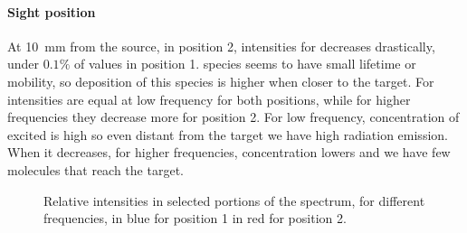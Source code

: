 \paragraph{Sight position} At \SI{10}{\milli\meter} from the source, in position 2, intensities for  decreases drastically, under $0.1\%$ of values in position 1.  species seems to have small lifetime or mobility, so deposition of this species is higher when closer to the target.
For  intensities are equal at low frequency for both positions, while for higher frequencies they decrease more for position 2. For low frequency, concentration of excited  is high so even distant from the target we have high radiation emission. When it decreases, for higher frequencies, concentration lowers and we have few molecules that reach the target.
\begin{figure}
\centering
 \hspace{0.55\textwidth}
 \hfill
 \caption{Relative intensities in selected portions of the spectrum, for different frequencies, in blue for position 1 in red for position 2.}
 \label{fig:irel}
\end{figure}


